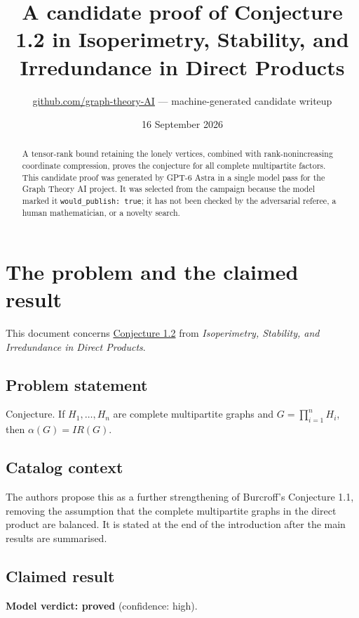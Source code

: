 \documentclass[
  11pt,
  a4paper,
]{article}
\title{A candidate proof of Conjecture 1.2 in Isoperimetry, Stability,
and Irredundance in Direct Products}
\author{\href{https://github.com/graph-theory-AI}{github.com/graph-theory-AI}
--- machine-generated candidate writeup}
\date{16 September 2026}
\begin{document}
\maketitle
\begin{abstract}
A tensor-rank bound retaining the lonely vertices, combined with
rank-nonincreasing coordinate compression, proves the conjecture for all
complete multipartite factors. This candidate proof was generated by
GPT-6 Astra in a single model pass for the Graph Theory AI project. It
was selected from the campaign because the model marked it
\texttt{would\_publish:\ true}; it has not been checked by the
adversarial referee, a human mathematician, or a novelty search.
\end{abstract}

\section{The problem and the claimed
result}\label{the-problem-and-the-claimed-result}

This document concerns
\href{https://graph-theory-ai.github.io/graph-conjectures/arxiv/1904.02595__00/}{Conjecture
1.2} from \emph{Isoperimetry, Stability, and Irredundance in Direct
Products}.

\subsection{Problem statement}\label{problem-statement}

Conjecture. If \(H_1, \ldots, H_n\) are complete multipartite graphs and
\(G = \prod_{i=1}^{n} H_i\), then \(\alpha(G) = IR(G)\).

\subsection{Catalog context}\label{catalog-context}

The authors propose this as a further strengthening of Burcroff's
Conjecture 1.1, removing the assumption that the complete multipartite
graphs in the direct product are balanced. It is stated at the end of
the introduction after the main results are summarised.

\subsection{Claimed result}\label{claimed-result}

\textbf{Model verdict: proved} (confidence: high).
\end{document}
